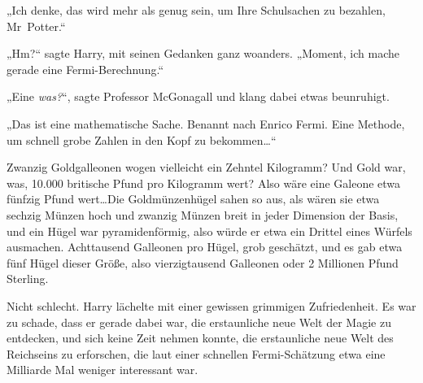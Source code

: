 „Ich denke, das wird mehr als genug sein, um Ihre Schulsachen zu bezahlen, Mr~Potter.“

„Hm?“ sagte Harry, mit seinen Gedanken ganz woanders. „Moment, ich mache gerade eine Fermi-Berechnung.“

„Eine \emph{was?}“, sagte Professor McGonagall und klang dabei etwas beunruhigt.

„Das ist eine mathematische Sache. Benannt nach Enrico Fermi. Eine Methode, um schnell grobe Zahlen in den Kopf zu bekommen…“

Zwanzig Goldgalleonen wogen vielleicht ein Zehntel Kilogramm? Und Gold war, was, 10.000 britische Pfund pro Kilogramm wert? Also wäre eine Galeone etwa fünfzig Pfund wert…Die Goldmünzenhügel sahen so aus, als wären sie etwa sechzig Münzen hoch und zwanzig Münzen breit in jeder Dimension der Basis, und ein Hügel war pyramidenförmig, also würde er etwa ein Drittel eines Würfels ausmachen. Achttausend Galleonen pro Hügel, grob geschätzt, und es gab etwa fünf Hügel dieser Größe, also vierzigtausend Galleonen oder 2 Millionen Pfund Sterling.

Nicht schlecht. Harry lächelte mit einer gewissen grimmigen Zufriedenheit. Es war zu schade, dass er gerade dabei war, die erstaunliche neue Welt der Magie zu entdecken, und sich keine Zeit nehmen konnte, die erstaunliche neue Welt des Reichseins zu erforschen, die laut einer schnellen Fermi-Schätzung etwa eine Milliarde Mal weniger interessant war.

